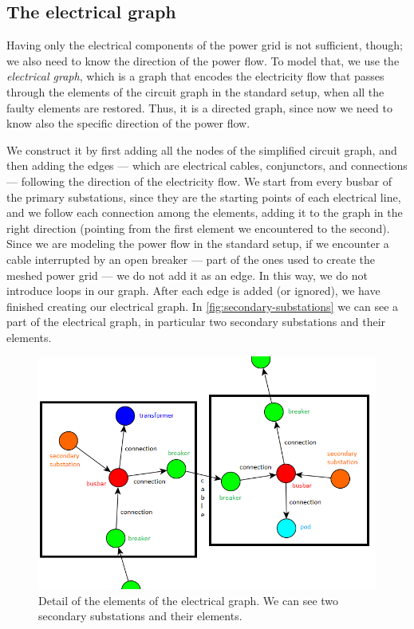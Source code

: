 \subsection{The electrical graph}

Having only the electrical components of the power grid is not sufficient, though; we also need to know the direction of the power flow. To model that, we use the \emph{electrical graph}, which is a graph that encodes the electricity flow that passes through the elements of the circuit graph in the standard setup, when all the faulty elements are restored. Thus, it is a directed graph, since now we need to know also the specific direction of the power flow.

We construct it by first adding all the nodes of the simplified circuit graph, and then adding the edges --- which are electrical cables, conjunctors, and connections --- following the direction of the electricity flow. We start from every busbar of the primary substations, since they are the starting points of each electrical line, and we follow each connection among the elements, adding it to the graph in the right direction (pointing from the first element we encountered to the second). Since we are modeling the power flow in the standard setup, if we encounter a cable interrupted by an open breaker --- part of the ones used to create the meshed power grid --- we do not add it as an edge.
In this way, we do not introduce loops in our graph. After each edge is added (or ignored), we have finished creating our electrical graph. In \autoref{fig:secondary-substations} we can see a part of the electrical graph, in particular two secondary substations and their elements.

\begin{figure}[htbp]
    \centering
    \includegraphics[scale=0.6]{chapters/figures/Secondary_substations.PNG}
    \caption{Detail of the elements of the electrical graph. We can see two secondary substations and their elements.}
    \label{fig:secondary-substations}
\end{figure}


